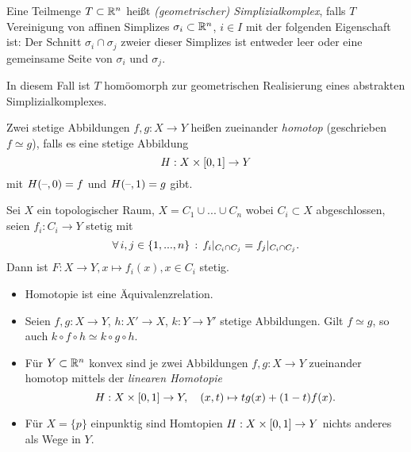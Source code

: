 \documentclass{cheat-sheet}
\begin{document}
\begin{defn}
  Eine Teilmenge $T \subset \mathbb{R}^n$ heißt \emph{(geometrischer) Simplizialkomplex}, falls $T$ Vereinigung von affinen Simplizes $\sigma_i \subset \mathbb{R}^n$, $i \in I$ mit der folgenden Eigenschaft ist: Der Schnitt $\sigma_i \cap \sigma_j$ zweier dieser Simplizes ist entweder leer oder eine gemeinsame Seite von $\sigma_i$ und $\sigma_j$.
\end{defn}

\begin{bem}
  In diesem Fall ist $T$ homöomorph zur geometrischen Realisierung eines abstrakten Simplizialkomplexes.
\end{bem}


\begin{defn}
  Zwei stetige Abbildungen $f, g : X \to Y$ heißen zueinander \emph{homotop} (geschrieben $f \simeq g$), falls es eine stetige Abbildung
  \[ H : X \times \left[ 0, 1 \right] \to Y \]
  mit $H(\text{--}, 0) = f$ und $H(\text{--}, 1) = g$ gibt.
\end{defn}

\begin{lem}
  Sei $X$ ein topologischer Raum, $X = C_1 \cup ... \cup C_n$ wobei $C_i \subset X$ abgeschlossen, seien $f_i : C_i \to Y$ stetig mit
  \[ \forall \, {i, j \in \{ 1, ..., n \}} \,:\, f_i|_{C_i \cap C_j} = f_j|_{C_i \cap C_j}. \]
  Dann ist $F : X \to Y, x \mapsto f_i(x), x \in C_i$ stetig.
\end{lem}

\begin{prop}
  \begin{itemize}
    \item Homotopie ist eine Äquivalenzrelation.
    \item Seien $f, g : X \to Y$, $h : X' \to X$, $k : Y \to Y'$ stetige Abbildungen. Gilt $f \simeq g$, so auch $k \circ f \circ h \simeq k \circ g \circ h$.
  \end{itemize}
\end{prop}

\begin{bsp}
  \begin{itemize}
    \item Für $Y \subset \mathbb{R}^n$ konvex sind je zwei Abbildungen $f, g : X \to Y$ zueinander homotop mittels der \emph{linearen Homotopie}
    \[ H : X \times \left[ 0, 1 \right] \to Y, \quad (x, t) \mapsto t g(x) + (1-t) f(x). \]
    \item Für $X = \{ p \}$ einpunktig sind Homtopien $H : X \times \left[ 0, 1 \right] \to Y$ nichts anderes als Wege in $Y$. %
  \end{itemize}
\end{bsp}
\end{document}
